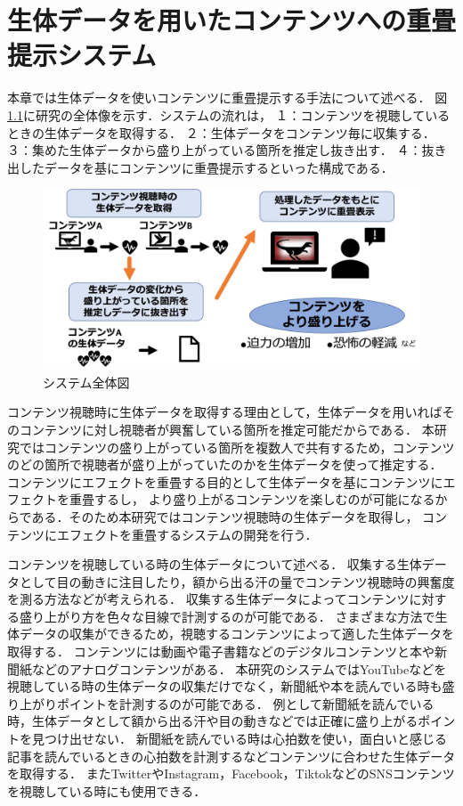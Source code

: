 \chapter{生体データを用いたコンテンツへの重畳提示システム}

\thispagestyle{myheadings}

本章では生体データを使いコンテンツに重畳提示する手法について述べる．
図\ref{systemall}に研究の全体像を示す．システムの流れは，
１：コンテンツを視聴しているときの生体データを取得する．
２：生体データをコンテンツ毎に収集する．
３：集めた生体データから盛り上がっている箇所を推定し抜き出す．
４：抜き出したデータを基にコンテンツに重畳提示するといった構成である．

\begin{figure}[H]
    \centering
    \includegraphics[width=15cm]{images/chapter3/allsysytem.png}
    \caption{システム全体図}
    \label{systemall}
\end{figure}



コンテンツ視聴時に生体データを取得する理由として，生体データを用いればそのコンテンツに対し視聴者が興奮している箇所を推定可能だからである．
本研究ではコンテンツの盛り上がっている箇所を複数人で共有するため，コンテンツのどの箇所で視聴者が盛り上がっていたのかを生体データを使って推定する．
コンテンツにエフェクトを重畳する目的として生体データを基にコンテンツにエフェクトを重畳するし，
より盛り上がるコンテンツを楽しむのが可能になるからである．そのため本研究ではコンテンツ視聴時の生体データを取得し，
コンテンツにエフェクトを重畳するシステムの開発を行う．

コンテンツを視聴している時の生体データについて述べる．
収集する生体データとして目の動きに注目したり，額から出る汗の量でコンテンツ視聴時の興奮度を測る方法などが考えられる．
収集する生体データによってコンテンツに対する盛り上がり方を色々な目線で計測するのが可能である．
さまざまな方法で生体データの収集ができるため，視聴するコンテンツによって適した生体データを取得する．
コンテンツには動画や電子書籍などのデジタルコンテンツと本や新聞紙などのアナログコンテンツがある．
本研究のシステムではYouTubeなどを視聴している時の生体データの収集だけでなく，新聞紙や本を読んでいる時も盛り上がりポイントを計測するのが可能である．
例として新聞紙を読んでいる時，生体データとして額から出る汗や目の動きなどでは正確に盛り上がるポイントを見つけ出せない．
新聞紙を読んでいる時は心拍数を使い，面白いと感じる記事を読んでいるときの心拍数を計測するなどコンテンツに合わせた生体データを取得する．
またTwitterやInstagram，Facebook，TiktokなどのSNSコンテンツを視聴している時にも使用できる．


